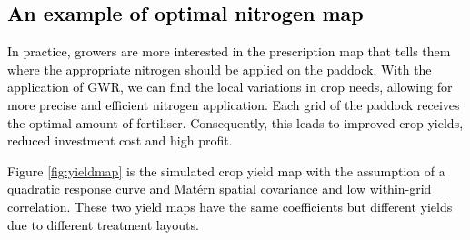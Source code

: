 \documentclass[a4paper]{article} 	%
\newcommand{\Matern}{Mat\'ern }
\newcommand{\zc}[1]{\textcolor{black}{#1}}
\begin{document}
\subsection{\zc{An example of optimal nitrogen map}}


\zc{In practice, growers are more interested in the prescription map that tells them where the appropriate nitrogen should be applied on the paddock. With the application of GWR, we can find the local variations in crop needs, allowing for more precise and efficient nitrogen application. Each grid of the paddock receives the optimal amount of fertiliser. Consequently, this leads to improved crop yields, reduced investment cost and high profit.}


\zc{Figure \ref{fig:yieldmap} is the simulated crop yield map with the assumption of a quadratic response curve and \Matern spatial covariance and low within-grid correlation. These two yield maps have the same coefficients but different yields due to different treatment layouts.}
\end{document}
